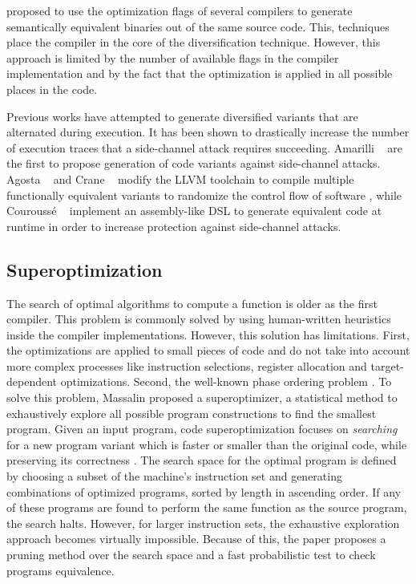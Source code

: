  \etal \citationneeded proposed to use the optimization flags of several compilers to generate semantically equivalent binaries out of the same source code. This, techniques place the compiler in the core of the diversification technique. However, this approach is limited by the number of available flags in the compiler implementation and by the fact that the optimization is applied in all possible places in the code.

Previous works have attempted to generate diversified variants that are alternated during execution.
It has been shown to drastically increase the number of execution traces that a side-channel attack requires succeeding.
Amarilli \etal~\cite{amarilli2011can} are the first to propose generation of code variants against side-channel attacks.
Agosta \etal~\cite{agosta2015meet} and Crane \etal~\cite{crane2015thwarting}
modify the LLVM toolchain to compile multiple functionally equivalent variants to randomize the control flow of software  ,
while Courouss{\'e} \etal~\cite{courousse2016runtime} implement an assembly-like DSL to generate equivalent code at runtime in order to increase protection against side-channel attacks.


\subsection*{Superoptimization}

The search of optimal algorithms to compute a function is older as the first compiler. This problem is commonly solved by using human-written heuristics inside the compiler implementations. However, this solution has limitations. First, the optimizations are applied to small pieces of code and do not take into account more complex processes like instruction selections, register allocation and target-dependent optimizations. Second, the well-known phase ordering problem \citationneeded. To solve this problem, Massalin \etal \cite{Massalin1987} proposed a superoptimizer, a statistical method to exhaustively explore all possible program constructions to find the smallest program.
Given an input program, code superoptimization focuses on \emph{searching} for a new program variant which is faster or smaller than the original code, while preserving its correctness \cite{bunel_learning_2017}.
The search space for the optimal program is defined by choosing a subset of the machine's instruction set and generating combinations of optimized programs, sorted by length in ascending order. If any of these programs are found to perform the same function as the source program, the search halts. However, for larger instruction sets, the exhaustive exploration approach becomes virtually impossible.
Because of this, the paper proposes a pruning method over the search space and a fast probabilistic test to check programs equivalence.

